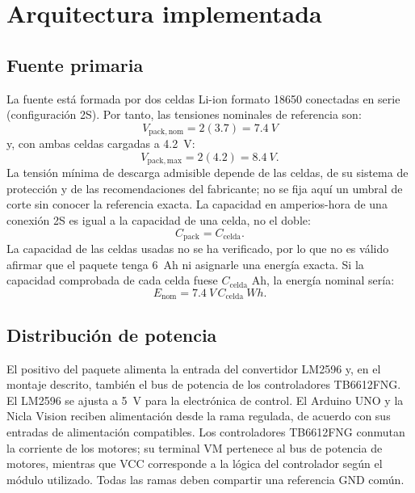\documentclass[conference]{IEEEtran}
\begin{document}
\section{Arquitectura implementada}
\subsection{Fuente primaria}
La fuente está formada por dos celdas Li-ion formato 18650 conectadas en serie (configuración 2S). Por tanto, las tensiones nominales de referencia son:
\begin{equation}
V_{\mathrm{pack,nom}} = 2(3.7)=\SI{7.4}{V}
\end{equation}
y, con ambas celdas cargadas a \SI{4.2}{V}:
\begin{equation}
V_{\mathrm{pack,max}} = 2(4.2)=\SI{8.4}{V}.
\end{equation}
La tensión mínima de descarga admisible depende de las celdas, de su sistema de protección y de las recomendaciones del fabricante; no se fija aquí un umbral de corte sin conocer la referencia exacta. La capacidad en amperios-hora de una conexión 2S es igual a la capacidad de una celda, no el doble:
\begin{equation}
C_{\mathrm{pack}}=C_{\mathrm{celda}}.
\end{equation}
La capacidad de las celdas usadas no se ha verificado, por lo que no es válido afirmar que el paquete tenga \SI{6}{Ah} ni asignarle una energía exacta. Si la capacidad comprobada de cada celda fuese \(C_{\mathrm{celda}}\) Ah, la energía nominal sería:
\begin{equation}
E_{\mathrm{nom}}=\SI{7.4}{V}\,C_{\mathrm{celda}}\ \si{Wh}.
\end{equation}

\subsection{Distribución de potencia}
El positivo del paquete alimenta la entrada del convertidor LM2596 y, en el montaje descrito, también el bus de potencia de los controladores TB6612FNG. El LM2596 se ajusta a \SI{5}{V} para la electrónica de control. El Arduino UNO y la Nicla Vision reciben alimentación desde la rama regulada, de acuerdo con sus entradas de alimentación compatibles. Los controladores TB6612FNG conmutan la corriente de los motores; su terminal VM pertenece al bus de potencia de motores, mientras que VCC corresponde a la lógica del controlador según el módulo utilizado. Todas las ramas deben compartir una referencia GND común.
\end{document}
